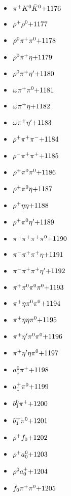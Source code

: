 \begin{multicols}{3}
\begin{itemize}
 \item $ \pi^{+} K^{0} \bar{K}^{0} \hfill{+1176}$
 \item $ \rho^{+} \rho^{0} \hfill{+1177}$
 \item $ \rho^{0} \pi^{+} \pi^{0} \hfill{+1178}$
 \item $ \rho^{0} \pi^{+} \eta \hfill{+1179}$
 \item $ \rho^{0} \pi^{+} {\eta^{\prime}} \hfill{+1180}$
 \item $ \omega \pi^{+} \pi^{0} \hfill{+1181}$
 \item $ \omega \pi^{+} \eta \hfill{+1182}$
 \item $ \omega \pi^{+} {\eta^{\prime}} \hfill{+1183}$
 \item $ \rho^{+} \pi^{+} \pi^{-} \hfill{+1184}$
 \item $ \rho^{-} \pi^{+} \pi^{+} \hfill{+1185}$
 \item $ \rho^{+} \pi^{0} \pi^{0} \hfill{+1186}$
 \item $ \rho^{+} \pi^{0} \eta \hfill{+1187}$
 \item $ \rho^{+} \eta \eta \hfill{+1188}$
 \item $ \rho^{+} \pi^{0} {\eta^{\prime}} \hfill{+1189}$
 \item $ \pi^{-} \pi^{+} \pi^{+} \pi^{0} \hfill{+1190}$
 \item $ \pi^{-} \pi^{+} \pi^{+} \eta \hfill{+1191}$
 \item $ \pi^{-} \pi^{+} \pi^{+} {\eta^{\prime}} \hfill{+1192}$
 \item $ \pi^{+} \pi^{0} \pi^{0} \pi^{0} \hfill{+1193}$
 \item $ \pi^{+} \eta \pi^{0} \pi^{0} \hfill{+1194}$
 \item $ \pi^{+} \eta \eta \pi^{0} \hfill{+1195}$
 \item $ \pi^{+} {\eta^{\prime}} \pi^{0} \pi^{0} \hfill{+1196}$
 \item $ \pi^{+} {\eta^{\prime}} \eta \pi^{0} \hfill{+1197}$
 \item $ a_{1}^{0} \pi^{+} \hfill{+1198}$
 \item $ a_{1}^{+} \pi^{0} \hfill{+1199}$
 \item $ b_{1}^{0} \pi^{+} \hfill{+1200}$
 \item $ b_{1}^{+} \pi^{0} \hfill{+1201}$
 \item $ \rho^{+} f_{0} \hfill{+1202}$
 \item $ \rho^{+} a_{0}^{0} \hfill{+1203}$
 \item $ \rho^{0} a_{0}^{+} \hfill{+1204}$
 \item $ f_{0} \pi^{+} \pi^{0} \hfill{+1205}$

\end{itemize}
\end{multicols}
